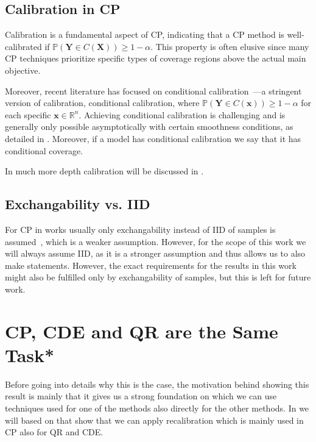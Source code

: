 \subsection{Calibration in CP}\label{sec:calibration_cp}

Calibration is a fundamental aspect of CP, indicating that a CP method is well-calibrated if $\mathbb{P}(\mathbf{Y} \in C(\mathbf{X})) \geq 1 - \alpha$. This property is often elusive since many CP techniques prioritize specific types of coverage regions above the actual main objective.

Moreover, recent literature has focused on conditional calibration~\cite{sesia2021conformal,izbicki2022cd,izbicki2019flexible,chernozhukov2021distributional}—a stringent version of calibration, conditional calibration, where $\mathbb{P}(\mathbf{Y} \in C(\mathbf{x})) \geq 1 - \alpha$ for each specific $\mathbf{x} \in \mathbb{R}^n$. Achieving conditional calibration is challenging and is generally only possible asymptotically with certain smoothness conditions, as detailed in . Moreover, if a model has conditional calibration we say that it has conditional coverage.

In much more depth calibration will be discussed in .

\subsection{Exchangability vs. IID}

For CP in works usually only exchangability instead of IID of samples is assumed~\cite{angelopoulos2021gentle}, which is a weaker assumption. However, for the scope of this work we will always assume IID, as it is a stronger assumption and thus allows us to also make statements. However, the exact requirements for the results in this work might also be fulfilled only by exchangability of samples, but this is left for future work.

\section{CP, CDE and QR are the Same Task*}\label{sec:cp_sub_cde}

Before going into details why this is the case, the motivation behind showing this result is mainly that it gives us a strong foundation on which we can use techniques used for one of the methods also directly for the other methods. In  we will based on that show that we can apply recalibration which is mainly used in CP also for QR and CDE.\@

